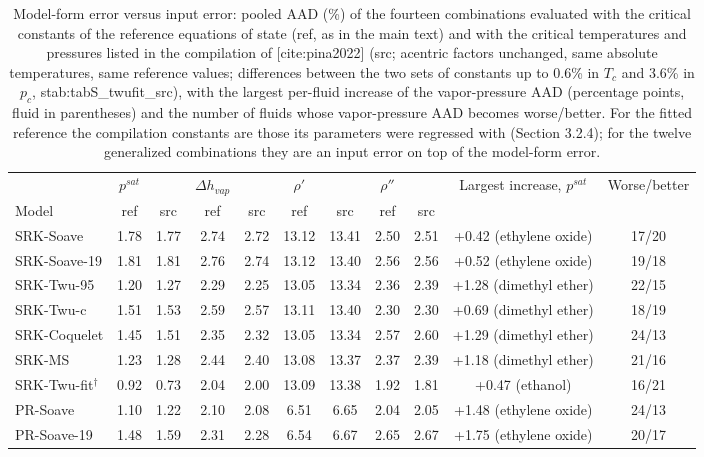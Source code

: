 \begin{table}[H]
\centering
\caption{Model-form error versus input error: pooled AAD (\%) of the fourteen combinations evaluated with the critical constants of the reference equations of state (ref, as in the main text) and with the critical temperatures and pressures listed in the compilation of [cite:pina2022] (src; acentric factors unchanged, same absolute temperatures, same reference values; differences between the two sets of constants up to 0.6\% in $T_c$ and 3.6\% in $p_c$, {stab:tabS_twufit_src}), with the largest per-fluid increase of the vapor-pressure AAD (percentage points, fluid in parentheses) and the number of fluids whose vapor-pressure AAD becomes worse/better. For the fitted reference the compilation constants are those its parameters were regressed with (Section 3.2.4); for the twelve generalized combinations they are an input error on top of the model-form error.}
\label{tab:tabS_srcconst}
\small
\begin{tabular}{lcccccccccc}
\toprule
 & $p^{sat}$ &  & $\Delta h_{vap}$ &  & $\rho'$ &  & $\rho''$ &  & Largest increase, $p^{sat}$ & Worse/better \\
Model & ref & src & ref & src & ref & src & ref & src &  &  \\
\midrule
SRK-Soave & 1.78 & 1.77 & 2.74 & 2.72 & 13.12 & 13.41 & 2.50 & 2.51 & +0.42 (ethylene oxide) & 17/20 \\
SRK-Soave-19 & 1.81 & 1.81 & 2.76 & 2.74 & 13.12 & 13.40 & 2.56 & 2.56 & +0.52 (ethylene oxide) & 19/18 \\
SRK-Twu-95 & 1.20 & 1.27 & 2.29 & 2.25 & 13.05 & 13.34 & 2.36 & 2.39 & +1.28 (dimethyl ether) & 22/15 \\
SRK-Twu-c & 1.51 & 1.53 & 2.59 & 2.57 & 13.11 & 13.40 & 2.30 & 2.30 & +0.69 (dimethyl ether) & 18/19 \\
SRK-Coquelet & 1.45 & 1.51 & 2.35 & 2.32 & 13.05 & 13.34 & 2.57 & 2.60 & +1.29 (dimethyl ether) & 24/13 \\
SRK-MS & 1.23 & 1.28 & 2.44 & 2.40 & 13.08 & 13.37 & 2.37 & 2.39 & +1.18 (dimethyl ether) & 21/16 \\
SRK-Twu-fit$^{\dagger}$ & 0.92 & 0.73 & 2.04 & 2.00 & 13.09 & 13.38 & 1.92 & 1.81 & +0.47 (ethanol) & 16/21 \\
\midrule
PR-Soave & 1.10 & 1.22 & 2.10 & 2.08 & 6.51 & 6.65 & 2.04 & 2.05 & +1.48 (ethylene oxide) & 24/13 \\
PR-Soave-19 & 1.48 & 1.59 & 2.31 & 2.28 & 6.54 & 6.67 & 2.65 & 2.67 & +1.75 (ethylene oxide) & 20/17 \\

\end{tabular}
\end{table}
